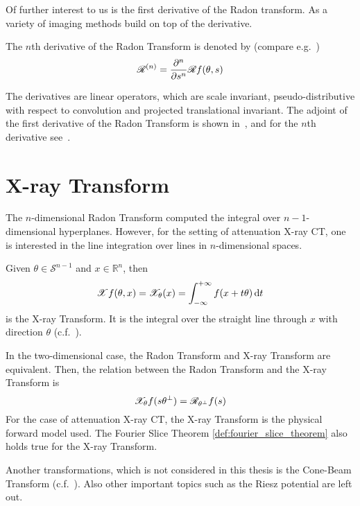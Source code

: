 Of further interest to us is the first derivative of the Radon transform. As a variety of imaging
methods build on top of the derivative.

\begin{definition}
	The \(n\)th derivative of the Radon Transform is denoted by (compare
	e.g.\ \cite{nilchian_differential_2012,nilchian_fast_2013})
	\[ \mathscr{R}^{(n)} = \frac{\partial^n}{\partial s^n} \mathscr{R} f(\theta, s)\]
\end{definition}

The derivatives are linear operators, which are scale invariant, pseudo-distributive with respect to
convolution and projected translational invariant. The adjoint of the first derivative of the Radon
Transform is shown in~\cite{nilchian_differential_2012}, and for the \(n\)th derivative
see~\cite{nilchian_fast_2013}.

\section{X-ray Transform}\label{sec:xray_transform}

The \(n\)-dimensional Radon Transform computed the integral over \(n-1\)-dimensional hyperplanes.
However, for the setting of attenuation X-ray CT, one is interested in the line integration over
lines in \(n\)-dimensional spaces.

\begin{definition}\label{def:x-ray_transform}
	Given \(\theta \in \mathscr{S}^{n-1}\) and \(x \in \mathbb{R}^n\), then
	\[ \mathscr{X} f(\theta, x) = \mathscr{X}_\theta(x) = \int_{-\infty}^{+\infty} f(x + t \theta) \, \mathrm{d}t\]
	is the X-ray Transform. It is the integral over the straight line through \(x\) with
	direction \(\theta\) (c.f.~\cite{natterer_mathematics_1986,solmon_x-ray_1976}).
\end{definition}

In the two-dimensional case, the Radon Transform and X-ray Transform are equivalent.
Then, the relation between the Radon Transform and the X-ray Transform is
\[\mathscr{X}_\theta f(s\theta^\perp) = \mathscr{R}_{\theta^\perp} f(s)\]
For the case of attenuation X-ray CT, the X-ray Transform is the physical forward model used. The
Fourier Slice Theorem \ref{def:fourier_slice_theorem} also holds true for the X-ray Transform.

Another transformations, which is not considered in this thesis is the Cone-Beam Transform
(c.f.~\cite[Chapter~2]{carpio_inverse_2008}). Also other important topics such as the Riesz
potential are left out.

